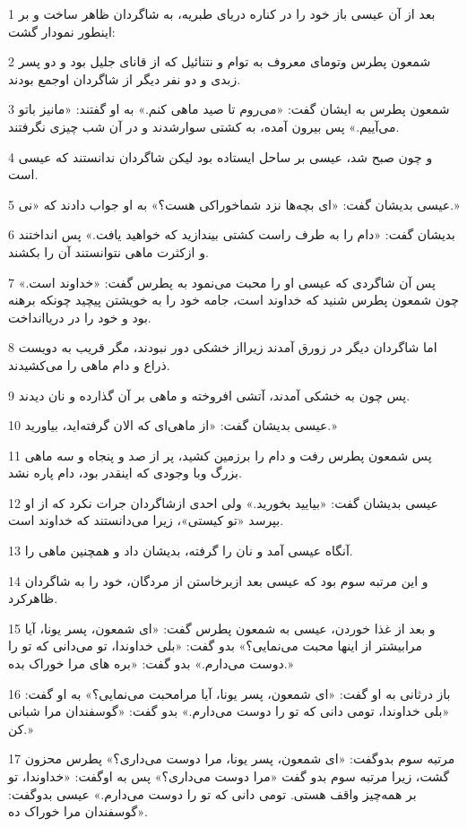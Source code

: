 \par 1 بعد از آن عیسی باز خود را در کناره دریای طبریه، به شاگردان ظاهر ساخت و بر اینطور نمودار گشت:
\par 2 شمعون پطرس وتومای معروف به توام و نتنائیل که از قانای جلیل بود و دو پسر زبدی و دو نفر دیگر از شاگردان اوجمع بودند.
\par 3 شمعون پطرس به ایشان گفت: «می‌روم تا صید ماهی کنم.» به او گفتند: «مانیز باتو می‌آییم.» پس بیرون آمده، به کشتی سوارشدند و در آن شب چیزی نگرفتند.
\par 4 و چون صبح شد، عیسی بر ساحل ایستاده بود لیکن شاگردان ندانستند که عیسی است.
\par 5 عیسی بدیشان گفت: «ای بچه‌ها نزد شماخوراکی هست؟» به او جواب دادند که «نی.»
\par 6 بدیشان گفت: «دام را به طرف راست کشتی بیندازید که خواهید یافت.» پس انداختند و ازکثرت ماهی نتوانستند آن را بکشند.
\par 7 پس آن شاگردی که عیسی او را محبت می‌نمود به پطرس گفت: «خداوند است.» چون شمعون پطرس شنید که خداوند است، جامه خود را به خویشتن پیچید چونکه برهنه بود و خود را در دریاانداخت.
\par 8 اما شاگردان دیگر در زورق آمدند زیرااز خشکی دور نبودند، مگر قریب به دویست ذراع و دام ماهی را می‌کشیدند.
\par 9 پس چون به خشکی آمدند، آتشی افروخته و ماهی بر آن گذارده و نان دیدند.
\par 10 عیسی بدیشان گفت: «از ماهی‌ای که الان گرفته‌اید، بیاورید.»
\par 11 پس شمعون پطرس رفت و دام را برزمین کشید، پر از صد و پنجاه و سه ماهی بزرگ وبا وجودی که اینقدر بود، دام پاره نشد.
\par 12 عیسی بدیشان گفت: «بیایید بخورید.» ولی احدی ازشاگردان جرات نکرد که از او بپرسد «تو کیستی»، زیرا می‌دانستند که خداوند است.
\par 13 آنگاه عیسی آمد و نان را گرفته، بدیشان داد و همچنین ماهی را.
\par 14 و این مرتبه سوم بود که عیسی بعد ازبرخاستن از مردگان، خود را به شاگردان ظاهرکرد.
\par 15 و بعد از غذا خوردن، عیسی به شمعون پطرس گفت: «ای شمعون، پسر یونا، آیا مرابیشتر از اینها محبت می‌نمایی؟» بدو گفت: «بلی خداوندا، تو می‌دانی که تو را دوست می‌دارم.» بدو گفت: «بره های مرا خوراک بده.»
\par 16 باز درثانی به او گفت: «ای شمعون، پسر یونا، آیا مرامحبت می‌نمایی؟» به او گفت: «بلی خداوندا، تومی دانی که تو را دوست می‌دارم.» بدو گفت: «گوسفندان مرا شبانی کن.»
\par 17 مرتبه سوم بدوگفت: «ای شمعون، پسر یونا، مرا دوست می‌داری؟» پطرس محزون گشت، زیرا مرتبه سوم بدو گفت «مرا دوست می‌داری؟» پس به اوگفت: «خداوندا، تو بر همه‌چیز واقف هستی. تومی دانی که تو را دوست می‌دارم.» عیسی بدوگفت: «گوسفندان مرا خوراک ده.
